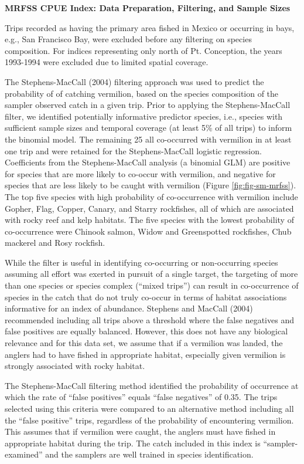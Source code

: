 \documentclass[
  english,
  a4paper,
]{article}
\begin{document}
\textbf{MRFSS CPUE Index: Data Preparation, Filtering, and Sample Sizes}

Trips recorded as having the primary area fished in Mexico or occurring in bays, e.g.,
San Francisco Bay, were excluded before any filtering on species composition.
For indices representing only north of Pt. Conception, the years 1993-1994 were
excluded due to limited spatial coverage.

The Stephens-MacCall (2004) filtering approach was used to predict the
probability of of catching vermilion, based
on the species composition of the sampler observed catch in a given trip. Prior
to applying the Stephens-MacCall filter, we identified potentially informative
predictor species, i.e., species with sufficient sample sizes and temporal coverage
(at least 5\% of all trips) to inform the binomial model. The remaining
25 all co-occurred with vermilion in at least one trip
and were retained for the Stephens-MacCall logistic regression. Coefficients
from the Stephens-MacCall analysis (a binomial GLM) are positive
for species that are more likely to co-occur with vermilion,
and negative for species that are less likely to be caught with vermilion
(Figure \ref{fig:fig-sm-mrfss}).
The top five species with high probability of co-occurrence with vermilion include
Gopher, Flag, Copper, Canary, and Starry rockfishes, all of which are associated with rocky reef and kelp
habitats. The five species with the lowest probability of co-occurrence were
Chinook salmon, Widow and Greenspotted rockfishes, Chub mackerel and Rosy rockfish.

While the filter is useful in identifying co-occurring or non-occurring species
assuming all effort was exerted in pursuit of a single target, the targeting of
more than one species or species complex (``mixed trips'') can result in co-occurrence of species in the catch
that do not truly co-occur in terms of habitat
associations informative for an index of abundance. Stephens and MacCall
(2004) recommended including all trips above a threshold where the
false negatives and false positives are equally balanced. However, this does
not have any biological relevance and for this data set, we assume that if a
vermilion was landed, the anglers had to have fished in appropriate habitat,
especially given vermilion is strongly associated with rocky habitat.

The Stephens-MacCall filtering method identified the probability of occurrence
at which the rate of ``false
positives'' equals ``false negatives'' of 0.35. The
trips selected using this criteria were compared to an alternative method
including all the ``false positive'' trips, regardless of the probability of
encountering vermilion.
This assumes that if vermilion were caught, the anglers must have fished in
appropriate habitat during the trip. The catch included in this index is
``sampler-examined'' and the samplers are well trained in species identification.
\end{document}

